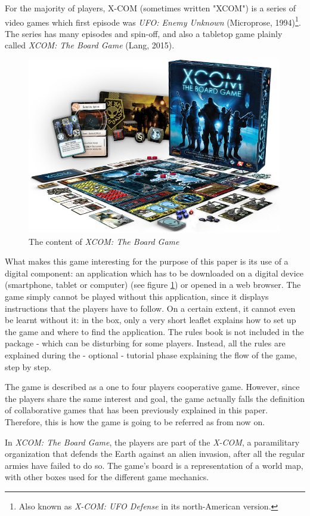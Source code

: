 For the majority of players, X-COM (sometimes written "XCOM") is a series of video games which first episode was \textit{UFO: Enemy Unknown}\cite{game:xcom} (Microprose, 1994)\footnote{Also known as \textit{X-COM: UFO Defense} in its north-American version.}. The series has many episodes and spin-off, and also a tabletop game plainly called \textit{XCOM: The Board Game} (Lang, 2015)\cite{game:xcomtbg}.
\begin{figure}[h]
    \centering
    \includegraphics[scale=0.5]{Images/xc01_layout.png}
    \caption{The content of \textit{XCOM: The Board Game}}
    \label{fig:XCOMBG}
\end{figure}
What makes this game interesting for the purpose of this paper is its use of a digital component: an application which has to be downloaded on a digital device (smartphone, tablet or computer) (see figure \ref{fig:XCOMBG}) or opened in a web browser. The game simply cannot be played without this application, since it displays instructions that the players have to follow. On a certain extent, it cannot even be learnt without it: in the box, only a very short leaflet explains how to set up the game and where to find the application. The rules book is not included in the package - which can be disturbing for some players. Instead, all the rules are explained during the - optional - tutorial phase explaining the flow of the game, step by step. 

The game is described as a one to four players cooperative game. However, since the players share the same interest and goal, the game actually falls the definition of collaborative games that has been previously explained in this paper. Therefore, this is how the game is going to be referred as from now on.

In \textit{XCOM: The Board Game}, the players are part of the \textit{X-COM}, a paramilitary organization that defends the Earth against an alien invasion, after all the regular armies have failed to do so. The game's board is a representation of a world map, with other boxes used for the different game mechanics.

